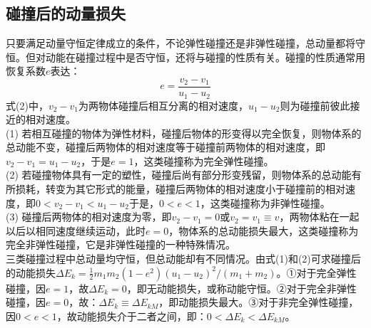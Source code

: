 \documentclass{article}
\begin{document}
\subsection{碰撞后的动量损失}
\hspace*{2em}只要满足动量守恒定律成立的条件，不论弹性碰撞还是非弹性碰撞，总动量都将守恒。但对动能在碰撞过程中是否守恒，还将与碰撞的性质有关。碰撞的性质通常用恢复系数$e$表达：
\begin{equation}
    e=\frac{v_2-v_1}{u_1-u_2}
\end{equation}
\hspace*{2em}式(2)中，\(v_2 - v_1\)为两物体碰撞后相互分离的相对速度，\(u_1 - u_2\)则为碰撞前彼此接近的相对速度。\\
\hspace*{2em}(1) 若相互碰撞的物体为弹性材料，碰撞后物体的形变得以完全恢复，则物体系的总动能不变，碰撞后两物体的相对速度等于碰撞前两物体的相对速度，即\(v_2 - v_1 = u_1 - u_2\)，于是\(e = 1\)，这类碰撞称为完全弹性碰撞。\\
\hspace*{2em}(2) 若碰撞物体具有一定的塑性，碰撞后尚有部分形变残留，则物体系的总动能有所损耗，转变为其它形式的能量，碰撞后两物体的相对速度小于碰撞前的相对速度，即\(0 < v_2 - v_1 < u_1 - u_2\)于是，\(0 < e < 1\)，这类碰撞称为非弹性碰撞。\\
\hspace*{2em}(3) 碰撞后两物体的相对速度为零，即\(v_2 - v_1 = 0\)或\(v_2 = v_1 \equiv v\)，两物体粘在一起以后以相同速度继续运动，此时\(e = 0\)，物体系的总动能损失最大，这类碰撞称为完全非弹性碰撞，它是非弹性碰撞的一种特殊情况。\\
\hspace*{2em}三类碰撞过程中总动量均守恒，但总动能却有不同情况。由式(1)和(2)可求碰撞后的动能损失\(\Delta E_{k}=\frac{1}{2}m_{1}m_{2}(1 - e^{2})(u_{1}-u_{2})^{2}/(m_{1}+m_{2})\)。①对于完全弹性碰撞，因\(e = 1\)，故\(\Delta E_{k}=0\)，即无动能损失，或称动能守恒。②对于完全非弹性碰撞，因\(e = 0\)，故：\(\Delta E_{k}\equiv\Delta E_{kM}\)，即动能损失最大。③对于非完全弹性碰撞，因\(0 < e < 1\)，故动能损失介于二者之间，即：\(0 < \Delta E_{k}<\Delta E_{kM}\)。 
\end{document}
